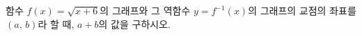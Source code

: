 \hspace*{2mm}\begin{minipage}[t]{\dimexpr\linewidth-2mm\relax}\vspace{0pt}
함수 $f(x)=\sqrt{x+6}$의 그래프와 그 역함수 $y=f^{-1}(x)$의 그래프의 교점의 좌표를 $(a,\,b)$라 할 때, $a+b$의 값을 구하시오.\end{minipage}
